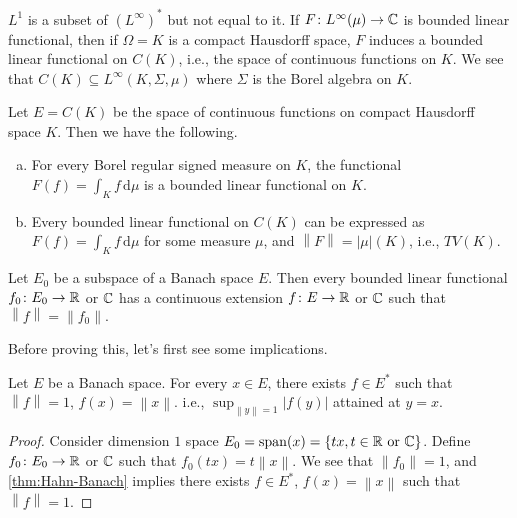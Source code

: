 \begin{remark}
	\(L^1\) is a subset of \((L^{\infty})^{\ast}\) but not equal to it. If \(F\colon L^{\infty} (\mu )\to \mathbb{\MakeUppercase{c}} \) is bounded linear functional, then if \(\Omega = K\) is a compact Hausdorff space, \(F\) induces a bounded linear functional on \(C(K)\), i.e., the space of continuous functions on \(K\). We see that \(C(K)\subseteq L^{\infty} (K, \Sigma , \mu )\) where \(\Sigma \) is the Borel algebra on \(K\).
\end{remark}

\begin{theorem}
	Let \(E = C(K)\) be the space of continuous functions on compact Hausdorff space \(K\). Then we have the following.
	\begin{enumerate}[(a)]
		\item For every Borel regular signed measure on \(K\), the functional \(F(f) = \int _K f\,\mathrm{d} \mu \) is a bounded linear functional on \(K\).
		\item Every bounded linear functional on \(C(K)\) can be expressed as \(F(f) = \int _K f\,\mathrm{d} \mu \)  for some measure \(\mu \), and \(\left\lVert F\right\rVert = \left\vert \mu  \right\vert (K) \), i.e., \(TV(K)\).
	\end{enumerate}
\end{theorem}


\begin{theorem}\label{thm:Hahn-Banach}
	Let \(E_0\) be a subspace of a Banach space \(E\). Then every bounded linear functional \(f_0 \colon E_0 \to \mathbb{\MakeUppercase{r}} \) or \(\mathbb{\MakeUppercase{c}} \) has a continuous extension \(f\colon E\to \mathbb{\MakeUppercase{r}} \) or \(\mathbb{\MakeUppercase{c}} \) such that \(\left\lVert f\right\rVert = \left\lVert f_0\right\rVert.\)
\end{theorem}

Before proving this, let's first see some implications.

\begin{proposition}\label{thm:supporting-hyperplane-theorem}
	Let \(E\) be a Banach space. For every \(x\in E\), there exists \(f\in E^{\ast} \)  such that \(\left\lVert f\right\rVert = 1\), \(f(x) = \left\lVert x\right\rVert \). i.e., \(\sup _{\left\lVert y\right\rVert = 1} \left\vert f(y) \right\vert \) attained at \(y = x\).
\end{proposition}
\begin{proof}
	Consider dimension \(1\) space \(E_0 = \mathop{\mathrm{span}}(x) = \left\{ tx,t\in \mathbb{\MakeUppercase{r}} \text{ or }\mathbb{\MakeUppercase{c}}   \right\} \). Define \(f_0\colon E_0 \to \mathbb{\MakeUppercase{r}} \) or \(\mathbb{\MakeUppercase{c}} \) such that \(f_0(tx) = t \left\lVert x\right\rVert \). We see that \(\left\lVert f_0\right\rVert = 1\), and \autoref{thm:Hahn-Banach} implies there exists \(f\in E^{\ast} \), \(f(x) = \left\lVert x\right\rVert \) such that \(\left\lVert f\right\rVert =1\).
\end{proof}

